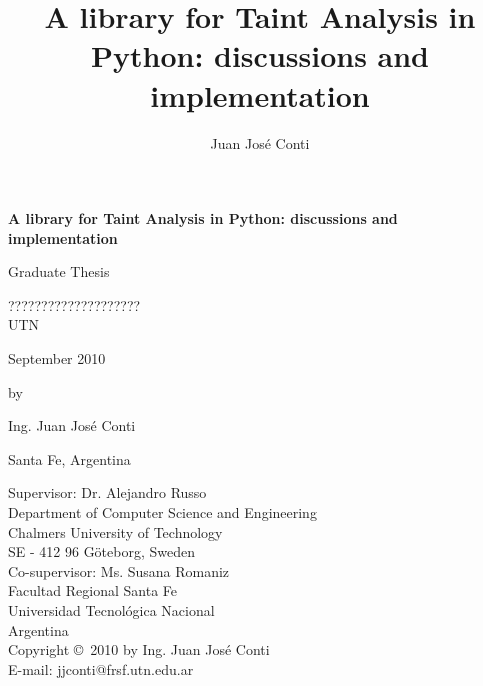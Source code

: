 \documentclass[a4paper]{report}
\title{A library for Taint Analysis in Python: discussions and implementation}
\author{Juan Jos\'{e} Conti}
\newcommand{\myTitle}{A library for Taint Analysis in Python: discussions and implementation}
\newcommand{\mySubtitle}{}
\newcommand{\myAuthor}{Ing. Juan Jos\'{e} Conti}
\begin{document}
\pagestyle{plain}

\thispagestyle{empty}

\clearpage
\par\vskip 2cm
\begin{center}
{\Huge\bf \myTitle                                         %
\vskip 1cm \Large \mySubtitle                              }           %
\par\vspace {6cm}
{\large Graduate Thesis }
\par\vspace {1cm}
{\large ????????????????????\\
UTN  }
\par \vspace{1cm}
{\large September 2010  }            %
\par\vspace {1cm} {\large by}
\par \vspace {1cm}
{\Large \myAuthor            }                                  %
\par\vspace {1cm}
{\large Santa Fe, Argentina}                 %
\end{center}

\clearpage

\thispagestyle{empty}
\noindent
Supervisor: Dr. Alejandro Russo \\
Department of Computer Science and Engineering \\
Chalmers University of Technology \\
SE - 412 96 G\"{o}teborg, Sweden \\

\noindent
Co-supervisor: Ms. Susana Romaniz\\
Facultad Regional Santa Fe \\
Universidad Tecnol\'{o}gica Nacional \\
Argentina\\

\vfill\noindent
Copyright \copyright\ 2010 by \myAuthor \\
E-mail: jjconti@frsf.utn.edu.ar

\clearpage

\tableofcontents

\listoffigures
{}

\listoftables
{}
\end{document}

